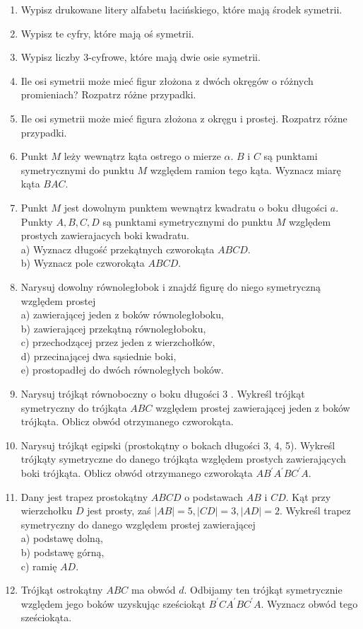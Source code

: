 \documentclass[10pt]{article}
\begin{document}
\begin{enumerate}
  \item Wypisz drukowane litery alfabetu łacińskiego, które mają środek symetrii.
  \item Wypisz te cyfry, które mają oś symetrii.
  \item Wypisz liczby 3-cyfrowe, które mają dwie osie symetrii.
  \item Ile osi symetrii może mieć figur złożona z dwóch okręgów o różnych promieniach? Rozpatrz różne przypadki.
  \item Ile osi symetrii może mieć figura złożona z okręgu i prostej. Rozpatrz różne przypadki.
  \item Punkt \(M\) leży wewnątrz kąta ostrego o mierze \(\alpha\). \(B\) i \(C\) są punktami symetrycznymi do punktu \(M\) względem ramion tego kąta. Wyznacz miarę kąta \(B A C\).
  \item Punkt \(M\) jest dowolnym punktem wewnątrz kwadratu o boku długości \(a\). Punkty \(A, B, C, D\) są punktami symetrycznymi do punktu \(M\) względem prostych zawierajacych boki kwadratu.\\
a) Wyznacz długość przekątnych czworokąta \(A B C D\).\\
b) Wyznacz pole czworokąta \(A B C D\).
  \item Narysuj dowolny równoległobok i znajdź figurę do niego symetryczną względem prostej\\
a) zawierającej jeden z boków równoległoboku,\\
b) zawierającej przekątną równoległoboku,\\
c) przechodzącej przez jeden z wierzchołków,\\
d) przecinającej dwa sąsiednie boki,\\
e) prostopadłej do dwóch równoległych boków.
  \item Narysuj trójkąt równoboczny o boku długości 3 . Wykreśl trójkąt symetryczny do trójkąta \(A B C\) względem prostej zawierającej jeden z boków trójkąta. Oblicz obwód otrzymanego czworokąta.
  \item Narysuj trójkąt egipski (prostokątny o bokach długości 3, 4, 5). Wykreśl trójkąty symetryczne do danego trójkąta względem prostych zawierających boki trójkąta. Oblicz obwód otrzymanego czworokąta \(A B^{\prime} A^{\prime} B C^{\prime} A\).
  \item Dany jest trapez prostokątny \(A B C D\) o podstawach \(A B\) i \(C D\). Kąt przy wierzchołku \(D\) jest prosty, zaś \(|A B|=5,|C D|=3,|A D|=2\). Wykreśl trapez symetryczny do danego względem prostej zawierającej\\
a) podstawę dolną,\\
b) podstawę górną,\\
c) ramię \(A D\).
  \item Trójkąt ostrokątny \(A B C\) ma obwód \(d\). Odbijamy ten trójkąt symetrycznie względem jego boków uzyskując sześciokąt \(B^{\prime} C A^{\prime} B C^{\prime} A\). Wyznacz obwód tego sześciokąta.
\end{enumerate}
\end{document}
